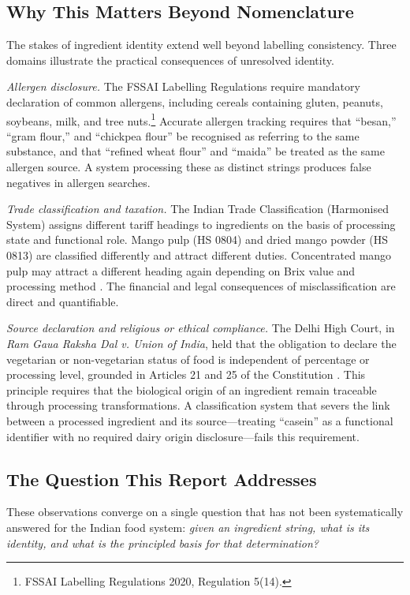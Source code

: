 \documentclass[12pt,a3paper]{article}
\begin{document}
\subsection{Why This Matters Beyond Nomenclature}

The stakes of ingredient identity extend well beyond labelling consistency. Three domains illustrate the practical consequences of unresolved identity.

\textit{Allergen disclosure.} The FSSAI Labelling Regulations require mandatory declaration of common allergens, including cereals containing gluten, peanuts, soybeans, milk, and tree nuts.\footnote{FSSAI Labelling Regulations 2020, Regulation 5(14).} Accurate allergen tracking requires that ``besan,'' ``gram flour,'' and ``chickpea flour'' be recognised as referring to the same substance, and that ``refined wheat flour'' and ``maida'' be treated as the same allergen source. A system processing these as distinct strings produces false negatives in allergen searches.

\textit{Trade classification and taxation.} The Indian Trade Classification (Harmonised System) assigns different tariff headings to ingredients on the basis of processing state and functional role. Mango pulp (HS 0804) and dried mango powder (HS 0813) are classified differently and attract different duties. Concentrated mango pulp may attract a different heading again depending on Brix value and processing method \cite{DGCI_CH11}. The financial and legal consequences of misclassification are direct and quantifiable.

\textit{Source declaration and religious or ethical compliance.} The Delhi High Court, in \textit{Ram Gaua Raksha Dal v. Union of India}, held that the obligation to declare the vegetarian or non-vegetarian status of food is independent of percentage or processing level, grounded in Articles 21 and 25 of the Constitution \cite{DelhiHC_RamGaua_2022}. This principle requires that the biological origin of an ingredient remain traceable through processing transformations. A classification system that severs the link between a processed ingredient and its source---treating ``casein'' as a functional identifier with no required dairy origin disclosure---fails this requirement.

\subsection{The Question This Report Addresses}

These observations converge on a single question that has not been systematically answered for the Indian food system: \textit{given an ingredient string, what is its identity, and what is the principled basis for that determination?}
\end{document}
